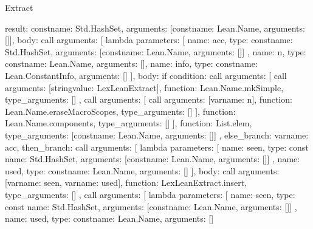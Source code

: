 \begin{lexlean}{Extract}
\begin{toolingmodule}
{{      result: const{name: Std.HashSet, arguments: [const{name: Lean.Name, arguments: []}]},
      body: call{
        arguments: [
          lambda{
            parameters: [
              {
                name: acc,
                type: const{name: Std.HashSet, arguments: [const{name: Lean.Name, arguments: []}]}
              },
              {name: n, type: const{name: Lean.Name, arguments: []}},
              {name: info, type: const{name: Lean.ConstantInfo, arguments: []}}
            ],
            body: if{
              condition: call{
                arguments: [
                  call{
                    arguments: [string{value: LexLeanExtract}],
                    function: Lean.Name.mkSimple,
                    type_arguments: []
                  },
                  call{
                    arguments: [
                      call{
                        arguments: [var{name: n}],
                        function: Lean.Name.eraseMacroScopes,
                        type_arguments: []
                      }
                    ],
                    function: Lean.Name.components,
                    type_arguments: []
                  }
                ],
                function: List.elem,
                type_arguments: [const{name: Lean.Name, arguments: []}]
              },
              else_branch: var{name: acc},
              then_branch: call{
                arguments: [
                  lambda{
                    parameters: [
                      {
                        name: seen,
                        type: const{
                          name: Std.HashSet,
                          arguments: [const{name: Lean.Name, arguments: []}]
                        }
                      },
                      {name: used, type: const{name: Lean.Name, arguments: []}}
                    ],
                    body: call{
                      arguments: [var{name: seen}, var{name: used}],
                      function: LexLeanExtract.insert,
                      type_arguments: []
                    }
                  },
                  call{
                    arguments: [
                      lambda{
                        parameters: [
                          {
                            name: seen,
                            type: const{
                              name: Std.HashSet,
                              arguments: [const{name: Lean.Name, arguments: []}]
                            }
                          },
                          {name: used, type: const{name: Lean.Name, arguments: []}}
}}}}}}}}
\end{toolingmodule}
\end{lexlean}
